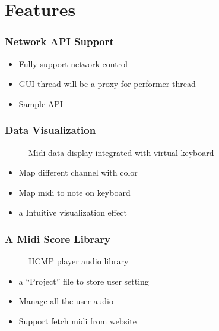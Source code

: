 \documentclass[t]{beamer}
\begin{document}
\section{Features}
\begin{frame}
\frametitle{Network API Support}
  \begin{itemize}
    \item Fully support network control 
    \item GUI thread will be a proxy for performer thread 
    \item Sample API
  \end{itemize}
   \begin{figure}[H] %
  \end{figure}
\end{frame}

\begin{frame}
\frametitle{Data Visualization}
\begin{figure}[H] %
\caption{Midi data display integrated with virtual keyboard}
\label{fig:speciation}
\end{figure}

\begin{itemize}
  \item Map different channel with color 
  \item Map midi to note on keyboard  
  \item a Intuitive visualization effect 
\end{itemize}

\end{frame}

\begin{frame}
\frametitle{A Midi Score Library}
\begin{figure}[H] %
\caption{HCMP player audio library}
\label{fig:speciation}
\end{figure}

\begin{itemize}
  \item a ``Project'' file to store user setting 
  \item Manage all the user audio  
  \item Support fetch midi from website  
\end{itemize}
\end{frame}
\end{document}
